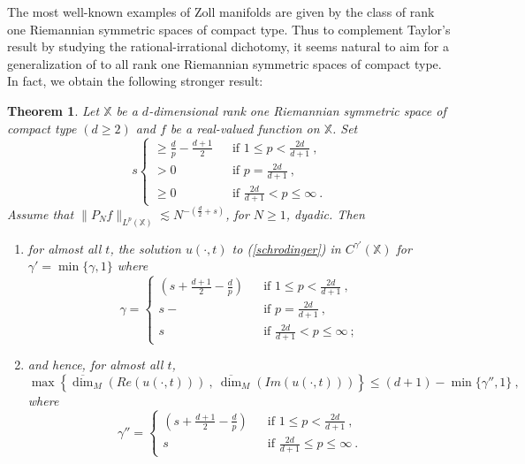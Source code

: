 \documentclass[12pt]{amsart}
\newtheorem{theorem}{Theorem}[section]
\theoremstyle{definition}
\newcommand{\X}{\mathbb X}%
\numberwithin{equation}{section}
\begin{document}
The most well-known examples of Zoll manifolds are given by the class of rank one Riemannian symmetric spaces of compact type. Thus to complement Taylor's result by studying the rational-irrational dichotomy, it seems natural to aim for a generalization of \cite[Theorem 1.1]{MathZ} to all rank one Riemannian symmetric spaces of compact type. In fact, we obtain the following stronger result:
\begin{theorem} \label{thm_talbot}
Let $\X$ be a $d$-dimensional rank one Riemannian symmetric space of compact type $(d \ge 2)$ and $f$ be a real-valued function on $\X$. Set
 \begin{equation*}
s  \begin{cases}
       \ge \frac{d}{p}-\frac{d+1}{2}\:\:&\text{ if } 1 \le p < \frac{2d}{d+1}\:,\\
	   > 0\:\:&\text{ if } p = \frac{2d}{d+1}\:,\\
	 \ge 0\:\:&\text{ if } \frac{2d}{d+1} < p \le \infty\:.
	\end{cases}
\end{equation*}
Assume that $\|P_Nf\|_{L^p(\X)} \lesssim N^{-\left(\frac{d}{2}+s\right)}$, for $N\ge 1$, dyadic. Then 
\begin{enumerate}
\item \label{talbot_part1} for almost all $t$, the solution $u(\cdot,t)$ to (\ref{schrodinger}) in $C^{\gamma'}(\X)$ 
for $\gamma'=\min\{\gamma,1\}$ where 
 \begin{equation*}
\gamma =\begin{cases}
      \left(s+\frac{d+1}{2}-\frac{d}{p}\right)\:\:&\text{ if } 1 \le p < \frac{2d}{d+1}\:,\\
	  s-\:\:&\text{ if } p= \frac{2d}{d+1}\:,\\
	 	s\:\:&\text{ if } \frac{2d}{d+1} < p \le \infty\:;
	\end{cases}
\end{equation*}
\item \label{talbot_part2} and hence, for almost all $t$,
\begin{equation*}
\max\left\{\overline{\dim}_M\left(Re\left(u(\cdot,t)\right)\right)\:,\:\overline{\dim}_M\left(Im\left(u(\cdot,t)\right)\right)\right\} \le (d+1)-\min\{\gamma'',1\}\:,
\end{equation*}
where
\begin{equation*}
\gamma'' =\begin{cases}
      \left(s+\frac{d+1}{2}-\frac{d}{p}\right)\:\:&\text{ if } 1 \le p < \frac{2d}{d+1}\:,\\
	   	s\:\:&\text{ if } \frac{2d}{d+1} \le p \le \infty\:.
	\end{cases}
\end{equation*}
\end{enumerate}
\end{theorem}
\end{document}

